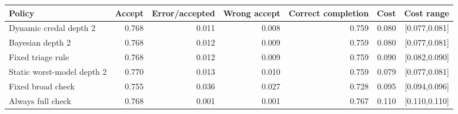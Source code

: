\begin{tabular}{@{}lrrrrrr@{}}
\toprule
Policy & Accept & Error/accepted & Wrong accept & Correct completion & Cost & Cost range\\
\midrule
Dynamic credal depth 2 & 0.768 & 0.011 & 0.008 & 0.759 & 0.080 & [0.077,0.081]\\
Bayesian depth 2 & 0.768 & 0.012 & 0.009 & 0.759 & 0.080 & [0.077,0.081]\\
Fixed triage rule & 0.768 & 0.012 & 0.009 & 0.759 & 0.090 & [0.082,0.090]\\
Static worst-model depth 2 & 0.770 & 0.013 & 0.010 & 0.759 & 0.079 & [0.077,0.081]\\
Fixed broad check & 0.755 & 0.036 & 0.027 & 0.728 & 0.095 & [0.094,0.096]\\
Always full check & 0.768 & 0.001 & 0.001 & 0.767 & 0.110 & [0.110,0.110]\\
\bottomrule
\end{tabular}
